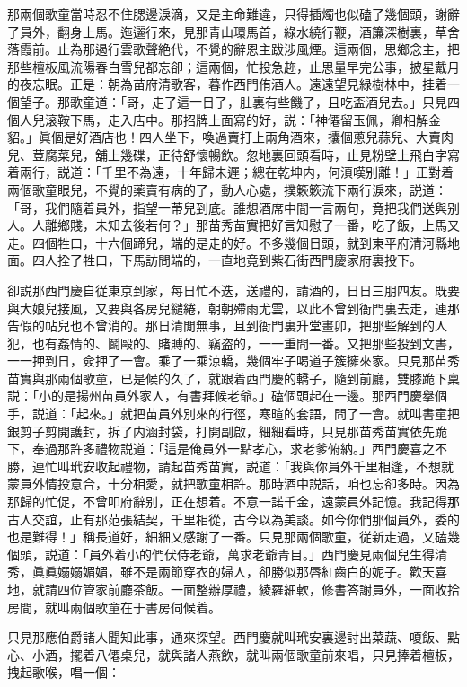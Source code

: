 那兩個歌童當時忍不住腮邊淚滴，又是主命難違，只得插燭也似磕了幾個頭，謝辭了員外，翻身上馬。迤邐行來，見那青山環馬首，綠水繞行鞭，酒簾深樹裏，草舍落霞前。止為那遏行雲歌聲絶代，不覺的辭恩主跋涉風煙。這兩個，思鄉念主，把那些檀板風流陽春白雪兒都忘卻；這兩個，忙投急趂，止思量早完公事，披星戴月的夜忘眠。正是：朝為苗府清歌客，暮作西門侑酒人。遠遠望見緑樹林中，挂着一個望子。那歌童道：「哥，走了這一日了，肚裏有些饑了，且吃盃酒兒去。」只見四個人兒滚鞍下馬，走入店中。那招牌上面寫的好，説：「神僊留玉佩，卿相解金貂。」眞個是好酒店也！四人坐下，喚過賣打上兩角酒來，攮個蔥兒蒜兒、大賣肉兒、荳腐菜兒，舖上幾碟，正待舒懷暢飲。忽地裏回頭看時，止見粉壁上飛白字寫着兩行，説道：「千里不為遠，十年歸未遲；總在乾坤内，何湏嘆别離！」正對着兩個歌童眼兒，不覺的薬賣有病的了，動人心處，撲簌簌流下兩行淚來，説道：「哥，我們隨着員外，指望一蒂兒到底。誰想酒席中間一言兩句，竟把我們送與别人。人離鄉賤，未知去後若何？」那苗秀苗實把好言知慰了一番，吃了飯，上馬又走。四個牲口，十六個蹄兒，端的是走的好。不多幾個日頭，就到東平府清河縣地面。四人拴了牲口，下馬訪問端的，一直地竟到紫石街西門慶家府裏投下。

卻説那西門慶自従東京到家，每日忙不迭，送禮的，請酒的，日日三朋四友。既要與大娘兒接風，又要與各房兒繾綣，朝朝殢雨尤雲，以此不曾到衙門裏去走，連那告假的帖兒也不曾消的。那日清閒無事，且到衙門裏升堂畫卯，把那些解到的人犯，也有姦情的、鬬毆的、賭賻的、竊盗的，一一重問一番。又把那些投到文書，一一押到日，僉押了一會。乘了一乘涼轎，幾個牢子喝道子簇擁來家。只見那苗秀苗實與那兩個歌童，已是候的久了，就跟着西門慶的轎子，隨到前廳，雙膝跪下稟説：「小的是揚州苗員外家人，有書拜候老爺。」磕個頭起在一邊。那西門慶擧個手，説道：「起來。」就把苗員外別來的行徑，寒暄的套語，問了一會。就叫書童把銀剪子剪開護封，拆了内涵封袋，打開副啟，細細看時，只見那苗秀苗實依先跪下，奉過那許多禮物説道：「這是俺員外一點孝心，求老爹俯納。」西門慶喜之不勝，連忙叫玳安收起禮物，請起苗秀苗實，説道：「我與你員外千里相逢，不想就蒙員外情投意合，十分相愛，就把歌童相許。那時酒中説話，咱也忘卻多時。因為那歸的忙促，不曾叩府辭别，正在想着。不意一諾千金，遠蒙員外記憶。我記得那古人交誼，止有那范張結契，千里相從，古今以為美談。如今你們那個員外，委的也是難得！」稱長道好，細細又感謝了一番。只見那兩個歌童，従新走過，又磕幾個頭，説道：「員外着小的們伏侍老爺，萬求老爺青目。」西門慶見兩個兒生得清秀，眞眞嫋嫋媚媚，雖不是兩節穿衣的婦人，卻勝似那唇紅齒白的妮子。歡天喜地，就請四位管家前廳茶飯。一面整辦厚禮，綾羅細軟，修書答謝員外，一面收拾房間，就叫兩個歌童在于書房伺候着。

只見那應伯爵諸人聞知此事，通來探望。西門慶就叫玳安裏邊討出菜蔬、嗄飯、點心、小酒，擺着八僊桌兒，就與諸人燕飲，就叫兩個歌童前來唱，只見捧着檀板，拽起歌喉，唱一個：

